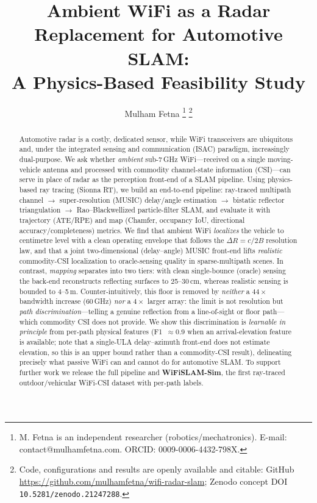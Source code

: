 \documentclass[journal]{IEEEtran}
\newcommand{\SI}[2]{#1\,#2}
\newcommand{\SIrange}[3]{#1--#2\,#3}
\begin{document}
\title{Ambient WiFi as a Radar Replacement for Automotive SLAM:\\
A Physics-Based Feasibility Study}

\author{Mulham Fetna%
\thanks{M. Fetna is an independent researcher (robotics/mechatronics).
E-mail: contact@mulhamfetna.com. ORCID: 0009-0006-4432-798X.}%
\thanks{Code, configurations and results are openly available and citable:
GitHub \url{https://github.com/mulhamfetna/wifi-radar-slam};
Zenodo concept DOI \texttt{10.5281/zenodo.21247288}.}}

\maketitle

\begin{abstract}
Automotive radar is a costly, dedicated sensor, while WiFi transceivers are
ubiquitous and, under the integrated sensing and communication (ISAC) paradigm,
increasingly dual-purpose. We ask whether \emph{ambient} sub-\SI{7}{GHz}
WiFi---received on a single moving-vehicle antenna and processed with commodity
channel-state information (CSI)---can serve in place of radar as the perception
front-end of a SLAM pipeline. Using physics-based ray tracing (Sionna RT), we
build an end-to-end pipeline: ray-traced multipath channel $\rightarrow$
super-resolution (MUSIC) delay/angle estimation $\rightarrow$ bistatic reflector
triangulation $\rightarrow$ Rao--Blackwellized particle-filter SLAM, and evaluate
it with trajectory (ATE/RPE) and map (Chamfer, occupancy IoU, directional
accuracy/completeness) metrics. We find that ambient WiFi \emph{localizes} the
vehicle to centimetre level with a clean operating envelope that follows the
$\Delta R = c/2B$ resolution law, and that a joint two-dimensional (delay--angle)
MUSIC front-end lifts \emph{realistic} commodity-CSI localization to
oracle-sensing quality in sparse-multipath scenes. In contrast, \emph{mapping}
separates into two tiers: with clean single-bounce (oracle) sensing the back-end
reconstructs reflecting surfaces to \SIrange{25}{30}{cm}, whereas realistic
sensing is bounded to \SIrange{4}{5}{m}. Counter-intuitively, this floor is
removed by \emph{neither} a $44\times$ bandwidth increase (\SI{60}{GHz}) \emph{nor}
a $4\times$ larger array: the limit is not resolution but \emph{path
discrimination}---telling a genuine reflection from a line-of-sight or floor
path---which commodity CSI does not provide. We show this discrimination is
\emph{learnable in principle} from per-path physical features (F1~$\approx0.9$ when an
arrival-elevation feature is available; note that a single-ULA delay--azimuth front-end
does not estimate elevation, so this is an upper bound rather than a commodity-CSI
result), delineating
precisely what passive WiFi can and cannot do for automotive SLAM. To support
further work we release the full pipeline and \textbf{WiFiSLAM-Sim}, the first
ray-traced outdoor/vehicular WiFi-CSI dataset with per-path labels.
\end{abstract}
\end{document}
